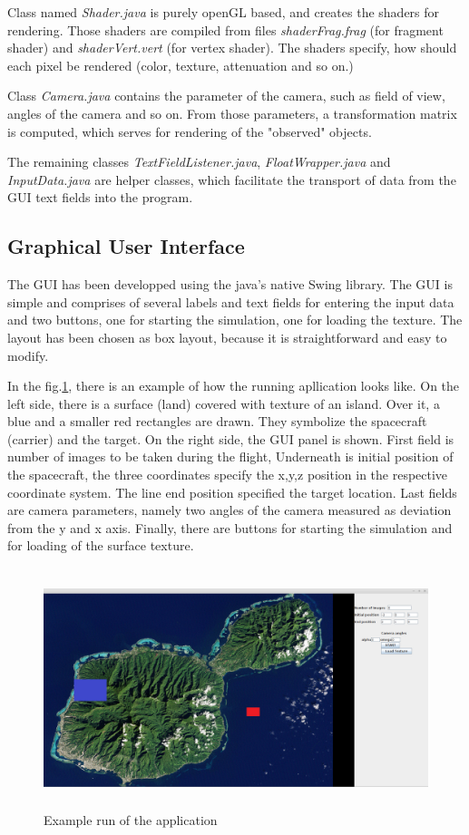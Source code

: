 \documentclass[english,12pt,a4paper,pdftex,elec,utf8]{aaltothesis}
\begin{document}
Class named \textit{Shader.java} is purely openGL based, and creates the shaders for rendering. Those shaders are compiled from files \textit{shaderFrag.frag} (for fragment shader) and \textit{shaderVert.vert} (for vertex shader). The shaders specify, how should each pixel be rendered (color, texture, attenuation and so on.)

Class \textit{Camera.java} contains the parameter of the camera, such as field of view, angles of the camera and so on. From those parameters, a transformation matrix is computed, which serves for rendering of the "observed" objects.

The remaining classes \textit{TextFieldListener.java}, \textit{FloatWrapper.java} and \textit{InputData.java} are helper classes, which facilitate the transport of data from the GUI text fields into the program.

\subsection*{Graphical User Interface}

The GUI has been developped using the java's native Swing library. The GUI is simple and comprises of several labels and text fields for entering the input data and two buttons, one for starting the simulation, one for loading the texture. The layout has been chosen as box layout, because it is straightforward and easy to modify.

In the fig.\ref{GUIExample}, there is an example of how the running apllication looks like. On the left side, there is a surface (land) covered with texture of an island. Over it, a blue and a smaller red rectangles are drawn. They symbolize the spacecraft (carrier) and the target. On the right side, the GUI panel is shown. First field is number of images to be taken during the flight, Underneath is initial position of the spacecraft, the three coordinates specify the x,y,z position in the respective coordinate system. The line end position specified the target location. Last fields are camera parameters, namely two angles of the camera measured as deviation from the y and x axis. Finally, there are buttons for starting the simulation and for loading of the surface texture.

\begin{figure}[htb]
\centering \includegraphics[height=7cm]{GUIExample.png}
\caption{Example run of the application\label{GUIExample}}
\end{figure}
\end{document}
